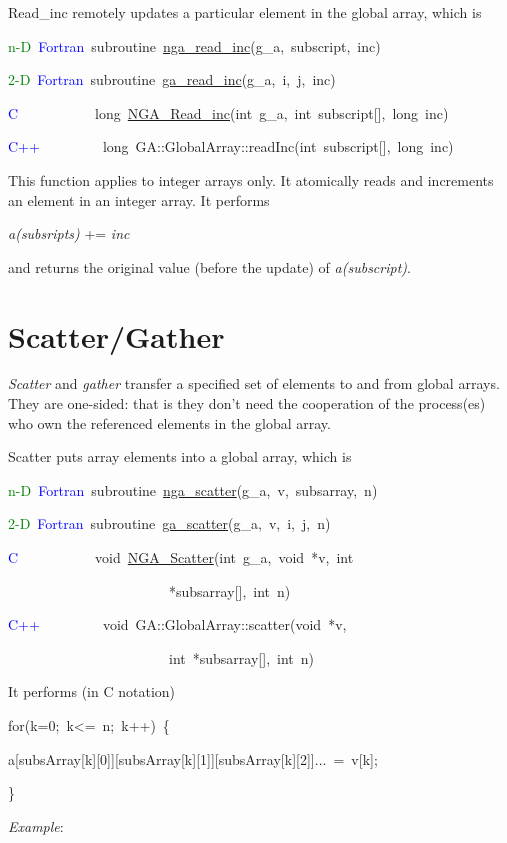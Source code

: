 Read\_inc remotely updates a particular element in the global array,
which is
\begin{lyxcode}
\textcolor{green}{n-D}~\textcolor{blue}{Fortran}~subroutine~\href{http://www.emsl.pnl.gov/docs/global/ga_ops.html\#ga_read_inc}{nga\_{}read\_{}inc}(g\_a,~subscript,~inc)~

\textcolor{green}{2-D}~\textcolor{blue}{Fortran}~subroutine~\href{http://www.emsl.pnl.gov/docs/global/ga_ops.html\#ga_read_inc}{ga\_{}read\_{}inc}(g\_a,~i,~j,~inc)~

\textcolor{blue}{C}~~~~~~~~~~~long~\href{http://www.emsl.pnl.gov/docs/global/c_nga_ops.html\#ga_read_inc}{NGA\_{}Read\_{}inc}(int~g\_a,~int~subscript{[}{]},~long~inc)~

\textcolor{blue}{C++}~~~~~~~~~long~GA::GlobalArray::readInc(int~subscript{[}{]},~long~inc)
\end{lyxcode}
This function applies to integer arrays only. It atomically reads
and increments an element in an integer array. It performs

\emph{a(subsripts)} += \emph{inc}

and returns the original value (before the update) of \emph{a(subscript)}. 


\section{Scatter/Gather }

\emph{Scatter} and \emph{gather} transfer a specified set of elements
to and from global arrays. They are one-sided: that is they don't
need the cooperation of the process(es) who own the referenced elements
in the global array.

Scatter puts array elements into a global array, which is
\begin{lyxcode}
\textcolor{green}{n-D}~\textcolor{blue}{Fortran}~subroutine~\href{http://www.emsl.pnl.gov/docs/global/ga_ops.html\#ga_scatter}{nga\_{}scatter}(g\_a,~v,~subsarray,~n)~

\textcolor{green}{2-D}~\textcolor{blue}{Fortran}~subroutine~\href{http://www.emsl.pnl.gov/docs/global/ga_ops.html\#ga_scatter}{ga\_{}scatter}(g\_a,~v,~i,~j,~n)~

\textcolor{blue}{C}~~~~~~~~~~~void~\href{http://www.emsl.pnl.gov/docs/global/c_nga_ops.html\#ga_scatter}{NGA\_{}Scatter}(int~g\_a,~void~{*}v,~int~

~~~~~~~~~~~~~~~~~~~~~~~{*}subsarray{[}{]},~int~n)~

\textcolor{blue}{C++~}~~~~~~~~void~GA::GlobalArray::scatter(void~{*}v,~

~~~~~~~~~~~~~~~~~~~~~~~int~{*}subsarray{[}{]},~int~n)
\end{lyxcode}
It performs (in C notation)
\begin{lyxcode}
for(k=0;~k<=~n;~k++)~\{

a{[}subsArray{[}k{]}{[}0{]}{]}{[}subsArray{[}k{]}{[}1{]}{]}{[}subsArray{[}k{]}{[}2{]}{]}...~=~v{[}k{]};~

\}
\end{lyxcode}
\emph{Example}:

